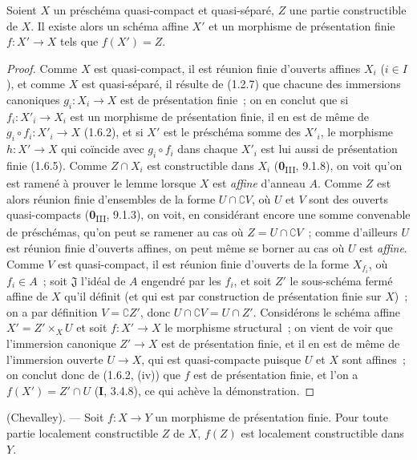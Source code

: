 \begin{lemma}[1.8.3]
\label{IV.1.8.3-fr}
Soient $X$ un préschéma quasi-compact et quasi-séparé, $Z$ une partie
constructible de $X$. Il existe alors un schéma affine $X'$ et un morphisme
de présentation finie $f:X'\to X$ tels que $f(X')=Z$.
\end{lemma}

\begin{proof}
Comme $X$ est quasi-compact, il est réunion finie d'ouverts affines $X_i$
($i\in I$), et comme $X$ est quasi-séparé, il résulte de (1.2.7) que chacune
des immersions canoniques $g_i:X_i\to X$ est de présentation finie~; on en
conclut que si $f_i:X'_i\to X_i$ est un morphisme de présentation finie, il
en est de même de $g_i\circ f_i:X'_i\to X$ (1.6.2), et si $X'$ est le
préschéma somme des $X'_i$, le morphisme $h:X'\to X$ qui coïncide avec
$g_i\circ f_i$ dans chaque $X'_i$ est lui aussi de présentation finie
(1.6.5). Comme $Z\cap X_i$ est constructible dans $X_i$
(\textbf{0}\textsubscript{III}, 9.1.8), on voit qu'on est ramené à prouver le lemme
lorsque $X$ est \emph{affine} d'anneau $A$. Comme $Z$ est alors réunion
finie d'ensembles de la forme $U\cap\complement V$, où $U$ et $V$ sont des
ouverts quasi-compacts (\textbf{0}\textsubscript{III}, 9.1.3), on voit, en considérant
encore une somme convenable de préschémas, qu'on peut se ramener au cas où
$Z=U\cap\complement V$~; comme d'ailleurs $U$ est réunion finie d'ouverts
affines, on peut même se borner au cas où $U$ est \emph{affine}. Comme $V$
est quasi-compact, il est réunion finie d'ouverts de la forme $X_{f_i}$, où
$f_i\in A$~; soit $\mathfrak J$ l'idéal de $A$ engendré par les $f_i$, et
soit $Z'$ le sous-schéma fermé affine de $X$ qu'il définit (et qui est par
construction de présentation finie sur $X$)~; on a par définition
$V=\complement Z'$, donc $U\cap\complement V=U\cap Z'$. Considérons le
schéma affine $X'=Z'\times_XU$
et soit $f:X'\to X$ le morphisme structural~; on vient de voir que
l'immersion canonique $Z'\to X$ est de présentation finie, et il en est de
même de l'immersion ouverte $U\to X$, qui est quasi-compacte puisque $U$ et
$X$ sont affines~; on conclut donc de (1.6.2, (iv)) que $f$ est de
présentation finie, et l'on a $f(X')=Z'\cap U$ (\textbf{I}, 3.4.8), ce qui achève la
démonstration.
\end{proof}

\begin{theorem}[1.8.4]
\label{IV.1.8.4-fr}
\textup{(Chevalley).} --- Soit $f:X\to Y$ un morphisme de présentation
finie. Pour toute partie localement constructible $Z$ de $X$, $f(Z)$ est
localement constructible dans $Y$.
\end{theorem}

